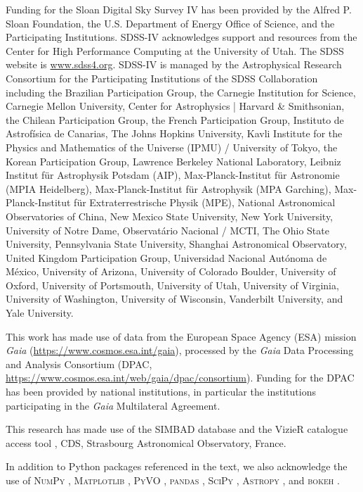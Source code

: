 \documentclass[fleqn,usenatbib]{mnras}
\begin{document}
Funding for the Sloan Digital Sky Survey IV has been provided by the Alfred P. Sloan Foundation, the U.S. Department of Energy Office of Science, and the Participating Institutions. 
SDSS-IV acknowledges support and resources from the Center for High Performance Computing at the University of Utah.
The SDSS website is \url{www.sdss4.org}.
SDSS-IV is managed by the Astrophysical Research Consortium for the Participating Institutions of the SDSS Collaboration including
the Brazilian Participation Group,
the Carnegie Institution for Science,
Carnegie Mellon University,
Center for Astrophysics | Harvard \& Smithsonian,
the Chilean Participation Group,
the French Participation Group,
Instituto de Astrof\'isica de Canarias,
The Johns Hopkins University,
Kavli Institute for the Physics and Mathematics of the Universe (IPMU) / University of Tokyo,
the Korean Participation Group,
Lawrence Berkeley National Laboratory,
Leibniz Institut f\"ur Astrophysik Potsdam (AIP),
Max-Planck-Institut f\"ur Astronomie (MPIA Heidelberg),
Max-Planck-Institut f\"ur Astrophysik (MPA Garching),
Max-Planck-Institut f\"ur Extraterrestrische Physik (MPE),
National Astronomical Observatories of China, New Mexico State University,
New York University,
University of Notre Dame,
Observat\'ario Nacional / MCTI,
The Ohio State University,
Pennsylvania State University,
Shanghai Astronomical Observatory,
United Kingdom Participation Group,
Universidad Nacional Aut\'onoma de M\'exico,
University of Arizona,
University of Colorado Boulder,
University of Oxford,
University of Portsmouth,
University of Utah,
University of Virginia,
University of Washington,
University of Wisconsin,
Vanderbilt University,
and Yale University.

This work has made use of data from the European Space Agency (ESA) mission \textit{Gaia} (\url{https://www.cosmos.esa.int/gaia}), processed by the \textit{Gaia} Data Processing and Analysis Consortium (DPAC,
\url{https://www.cosmos.esa.int/web/gaia/dpac/consortium}).
Funding for the DPAC has been provided by national institutions, in particular the institutions participating in the \textit{Gaia} Multilateral Agreement.

This research has made use of the SIMBAD database \citep{simbad} and the VizieR catalogue access tool \citep{vizier}, CDS, Strasbourg Astronomical Observatory, France.

In addition to Python packages referenced in the text, we also acknowledge the use of \textsc{NumPy} \citep{numpy}, \textsc{Matplotlib} \citep{matplotlib}, \textsc{PyVO} \citep{pyvo}, \textsc{pandas} \citep{pandas1, pandas2}, \textsc{SciPy} \citep{scipy}, \textsc{Astropy} \citep{astropy1, astropy2, astropy3}, and \textsc{bokeh} \citep{bokeh}.
\end{document}
